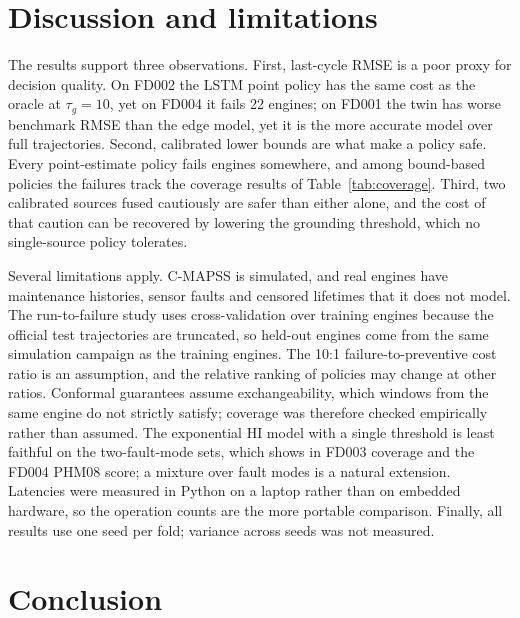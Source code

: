 \documentclass[pdflatex,sn-mathphys-num]{sn-jnl}
\begin{document}
\section{Discussion and limitations}\label{sec:discussion}

The results support three observations. First, last-cycle RMSE is a poor proxy for decision quality. On FD002 the LSTM point policy has the same cost as the oracle at $\tau_g = 10$, yet on FD004 it fails 22 engines; on FD001 the twin has worse benchmark RMSE than the edge model, yet it is the more accurate model over full trajectories. Second, calibrated lower bounds are what make a policy safe. Every point-estimate policy fails engines somewhere, and among bound-based policies the failures track the coverage results of Table~\ref{tab:coverage}. Third, two calibrated sources fused cautiously are safer than either alone, and the cost of that caution can be recovered by lowering the grounding threshold, which no single-source policy tolerates.

Several limitations apply. C-MAPSS is simulated, and real engines have maintenance histories, sensor faults and censored lifetimes that it does not model. The run-to-failure study uses cross-validation over training engines because the official test trajectories are truncated, so held-out engines come from the same simulation campaign as the training engines. The 10:1 failure-to-preventive cost ratio is an assumption, and the relative ranking of policies may change at other ratios. Conformal guarantees assume exchangeability, which windows from the same engine do not strictly satisfy; coverage was therefore checked empirically rather than assumed. The exponential HI model with a single threshold is least faithful on the two-fault-mode sets, which shows in FD003 coverage and the FD004 PHM08 score; a mixture over fault modes is a natural extension. Latencies were measured in Python on a laptop rather than on embedded hardware, so the operation counts are the more portable comparison. Finally, all results use one seed per fold; variance across seeds was not measured.

\section{Conclusion}\label{sec:conclusion}
\end{document}
